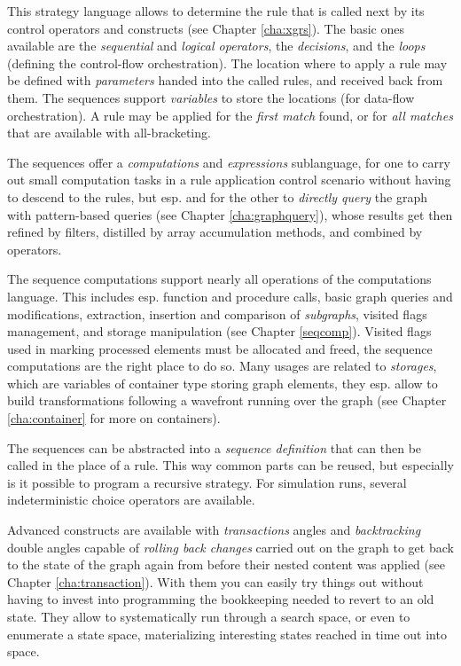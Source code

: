 This strategy language allows to determine the rule that is called next by its control operators and constructs (see Chapter \ref{cha:xgrs}).
The basic ones available are the \emph{sequential} and \emph{logical operators}, the \emph{decisions}, and the \emph{loops} (defining the control-flow orchestration).
The location where to apply a rule may be defined with \emph{parameters} handed into the called rules, and received back from them. 
The sequences support \emph{variables} to store the locations (for data-flow orchestration).
A rule may be applied for the \emph{first match} found, or for \emph{all matches} that are available with all-bracketing.

The sequences offer a \emph{computations} and \emph{expressions} sublanguage,
for one to carry out small computation tasks in a rule application control scenario without having to descend to the rules, but esp. and for the other to \emph{directly query} the graph with pattern-based queries (see Chapter \ref{cha:graphquery}), whose results get then refined by filters, distilled by array accumulation methods, and combined by operators.

The sequence computations support nearly all operations of the computations language.
This includes esp. function and procedure calls, basic graph queries and modifications, extraction, insertion and comparison of \emph{subgraphs}, visited flags management, and storage manipulation (see Chapter \ref{seqcomp}).
Visited flags used in marking processed elements must be allocated and freed, the sequence computations are the right place to do so.
Many usages are related to \emph{storages}, which are variables of container type storing graph elements, they esp. allow to build transformations following a wavefront running over the graph (see Chapter \ref{cha:container} for more on containers).

The sequences can be abstracted into a \emph{sequence definition} that can then be called in the place of a rule.
This way common parts can be reused, but especially is it possible to program a recursive strategy.
For simulation runs, several indeterministic choice operators are available.

Advanced constructs are available with \emph{transactions} angles and \emph{backtracking} double angles capable of \emph{rolling back changes} carried out on the graph to get back to the state of the graph again from before their nested content was applied (see Chapter \ref{cha:transaction}).
With them you can easily try things out without having to invest into programming the bookkeeping needed to revert to an old state.
They allow to systematically run through a search space, or even to enumerate a state space, materializing interesting states reached in time out into space.

